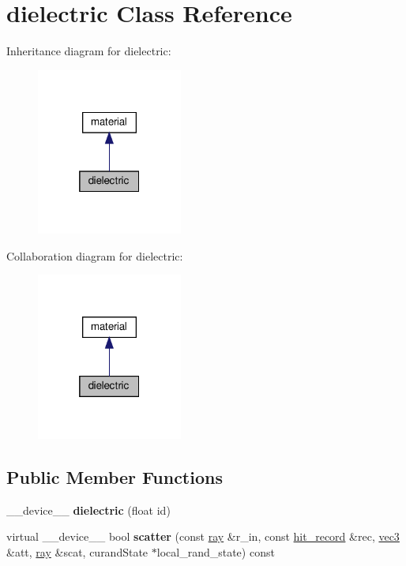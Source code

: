 \hypertarget{classdielectric}{}\section{dielectric Class Reference}
\label{classdielectric}


Inheritance diagram for dielectric\+:
\nopagebreak
\begin{figure}[H]
\begin{center}
\leavevmode
\includegraphics[width=136pt]{classdielectric__inherit__graph}
\end{center}
\end{figure}


Collaboration diagram for dielectric\+:
\nopagebreak
\begin{figure}[H]
\begin{center}
\leavevmode
\includegraphics[width=136pt]{classdielectric__coll__graph}
\end{center}
\end{figure}
\subsection*{Public Member Functions}
\begin{DoxyCompactItemize}
\item 
\mbox{\label{classdielectric_afdab9c9a371d74987507bde39cf84047}} 
\+\_\+\+\_\+device\+\_\+\+\_\+ {\bfseries dielectric} (float id)
\item 
\mbox{\label{classdielectric_a58aca32521bb31e5f964d8116420a16b}} 
virtual \+\_\+\+\_\+device\+\_\+\+\_\+ bool {\bfseries scatter} (const \hyperlink{classray}{ray} \&r\+\_\+in, const \hyperlink{structhit__record}{hit\+\_\+record} \&rec, \hyperlink{classvec3}{vec3} \&att, \hyperlink{classray}{ray} \&scat, curand\+State $\ast$local\+\_\+rand\+\_\+state) const
\end{DoxyCompactItemize}
